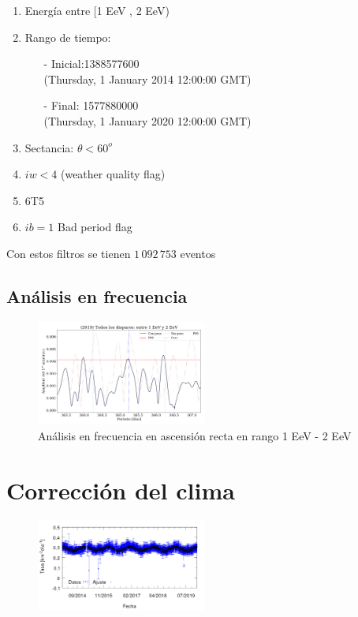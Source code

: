 \begin{enumerate}
	\item Energía entre  [1 EeV , 2 EeV)
	\item Rango de tiempo:
	\begin{itemize}
		\item[-] Inicial:1388577600 \\ (Thursday, 1 January 2014 12:00:00 GMT)
		\item[-] Final: 1577880000  \\ (Thursday, 1 January 2020 12:00:00 GMT)
	\end{itemize}
	\item Sectancia:  $\theta < 60^o$
	\item $iw<4$ (weather quality flag)
	\item 6T5
	\item $ib=1$ Bad period flag
\end{enumerate}


Con estos filtros se tienen $1\,092\,753$ eventos

\subsection{Análisis en frecuencia}

\begin{figure}[H]
	\centering
	\includegraphics[width=0.5\textwidth]{2019_AllTriggers_1_2_EeV_con_vs_sin_peso.png}
	\caption{Análisis en frecuencia en ascensión recta en rango 1 EeV - 2 EeV}
	\label{fig:consin}
\end{figure}


\section{Corrección del clima}

\begin{figure}[H]
	\centering
	\includegraphics[width=0.5\textwidth]{rate_Ajuste.png}
\end{figure}



